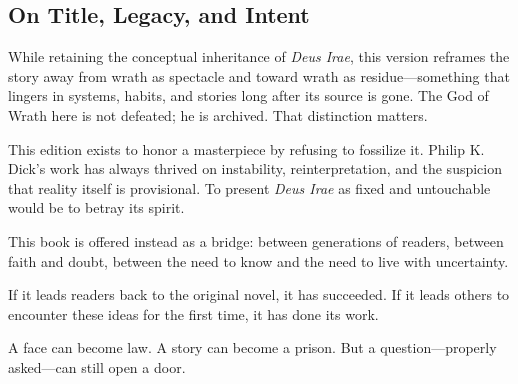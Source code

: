 \subsection*{On Title, Legacy, and Intent}

While retaining the conceptual inheritance of \emph{Deus Irae}, this version reframes the story away from wrath as spectacle and toward wrath as residue---something that lingers in systems, habits, and stories long after its source is gone. The God of Wrath here is not defeated; he is archived. That distinction matters.

This edition exists to honor a masterpiece by refusing to fossilize it. Philip K. Dick's work has always thrived on instability, reinterpretation, and the suspicion that reality itself is provisional. To present \emph{Deus Irae} as fixed and untouchable would be to betray its spirit.

This book is offered instead as a bridge: between generations of readers, between faith and doubt, between the need to know and the need to live with uncertainty.

If it leads readers back to the original novel, it has succeeded. If it leads others to encounter these ideas for the first time, it has done its work.

A face can become law.  
A story can become a prison.  
But a question---properly asked---can still open a door.
